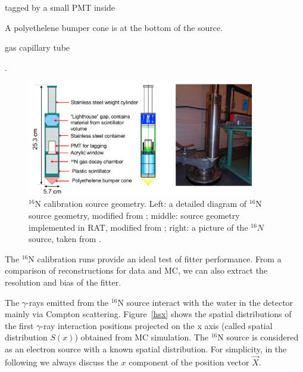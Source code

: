 tagged by a small PMT inside

A polyethelene bumper cone is at the bottom of the source.

 



gas capillary tube


 

\cite{dragowsky1999sudbury}.
 

\begin{figure}[!htb]
	\centering
	\includegraphics[width=10cm]{n16geom.png}
	\caption{$^{16}$N calibration source geometry. Left: a detailed diagram of $^{16}$N source geometry, modified from \cite{maclellan2009energy,matt_deployedsource}; middle: source geometry implemented in RAT, modified from \cite{n16geom_zach}; right: a picture of the $^{16}N$ source, taken from \cite{n16pic}.}
	\label{n16pic}
\end{figure}



The $^{16}$N calibration runs provide an ideal test of fitter performance. From a comparison of reconstructions for data and MC, we can also extract the resolution and bias of the fitter.



The $\gamma$-rays emitted from the $^{16}$N source interact with the water in the detector mainly via Compton scattering. Figure~\ref{hsx} shows the spatial distributions of the first $\gamma$-ray interaction positions projected on the x axis (called spatial distribution $S(x)$) obtained from MC simulation. The $^{16}$N source is considered as an electron source with a known spatial distribution\cite{boulay2004direct}. For simplicity, in the following we always discuss the $x$ component of the position vector $\vec{X}$. 






